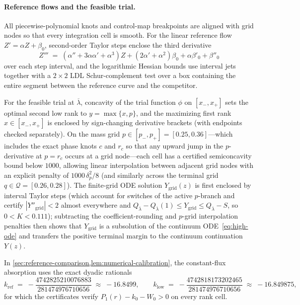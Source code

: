 \documentclass[11pt]{article}
\numberwithin{equation}{section}
\theoremstyle{plain}
\theoremstyle{definition}
\newcommand{\1}{\mathbf{1}}
\newcommand{\calQ}{\mathcal{Q}}
\begin{document}
\paragraph{Reference flows and the feasible trial.}
All piecewise-polynomial knots and control-map breakpoints are aligned with grid nodes so that every integration cell is smooth. For the linear reference flow $Z' = \alpha Z + \beta_0$, second-order Taylor steps enclose the third derivative
\[
  Z''' \;=\; (\alpha'' + 3\alpha\alpha' + \alpha^3)Z + (2\alpha' + \alpha^2)\beta_0 + \alpha\beta'_0 + \beta''_0
\]
over each step interval, and the logarithmic Hessian bounds use interval jets together with a $2 \times 2$ LDL Schur-complement test over a box containing the entire segment between the reference curve and the competitor.

For the feasible trial at $\overline{\lambda}$, concavity of the trial function $\phi$ on $[x_-, x_+]$ sets the optimal second low rank to $y = \max\{x, p\}$, and the maximizing first rank $x \in [x_-, x_+]$ is enclosed by sign-changing derivative brackets (with endpoints checked separately). On the mass grid $p \in [p_-, p_+] = [0.25, 0.36]$---which includes the exact phase knots $c$ and $r_c$ so that any upward jump in the $p$-derivative at $p = r_c$ occurs at a grid node---each cell has a certified semiconcavity bound below $1000$, allowing linear interpolation between adjacent grid nodes with an explicit penalty of $1000\,\delta_p^2/8$ (and similarly across the terminal grid $q \in \calQ = [0.26, 0.28]$). The finite-grid ODE solution $Y_{\mathrm{grid}}(z)$ is first enclosed by interval Taylor steps (which account for switches of the active $p$-branch and certify $|Y''_{\mathrm{grid}}| < 2$ almost everywhere and $Q_{\overline{\lambda}} - Q_{\overline{\lambda}}(1) \le Y_{\mathrm{grid}} \le Q_{\overline{\lambda}} - S$, so $0 < K < 0.111$); subtracting the coefficient-rounding and $p$-grid interpolation penalties then shows that $Y_{\mathrm{grid}}$ is a subsolution of the continuum ODE~\eqref{eq:high-ode} and transfers the positive terminal margin to the continuum continuation $Y(z)$.

In \cref{sec:reference-comparison,lem:numerical-calibration}, the constant-flux absorption uses the exact dyadic rationals
\begin{equation}
  k_{\mathrm{ref}} \;=\; -\frac{4742825210076883}{281474976710656} \;\approx\; -16.8499,
  \qquad
  k_{\mathrm{low}} \;=\; -\frac{4742818173202465}{281474976710656} \;\approx\; -16.849875,
  \label{eq:certificate-flux-witnesses}
\end{equation}
for which the certificates verify $P_1(r) - k_0 - W_0 > 0$ on every rank cell.
\end{document}
